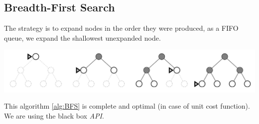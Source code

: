 \documentclass[10pt, letterpaper]{report}
\begin{document}
\subsection{Breadth-First Search}
The strategy is to expand nodes in the order they were produced, as a FIFO queue, we expand the shallowest unexpanded node.
\begin{center}
    \includegraphics[width=1\textwidth ]{images/bfs.png}
\end{center}
This algorithm \ref{alg:BFS} is complete and optimal (in case of unit cost function). We are using the black box \textit{API}.
\end{document}
